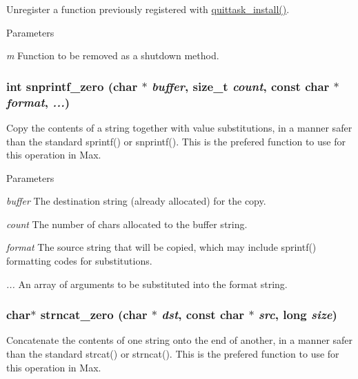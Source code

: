 Unregister a function previously registered with \hyperlink{group__misc_ga0638f6ac63b75fa53c0a34db8ec8d412}{quittask\_\-install()}. 
\begin{DoxyParams}{Parameters}
\item[{\em m}]Function to be removed as a shutdown method. \end{DoxyParams}
\hypertarget{group__misc_gab82e9c5bbc8b7fe70d16b1f6383f1cc4}{
\subsubsection[{snprintf\_\-zero}]{\setlength{\rightskip}{0pt plus 5cm}int snprintf\_\-zero (char $\ast$ {\em buffer}, \/  size\_\-t {\em count}, \/  const char $\ast$ {\em format}, \/   {\em ...})}}
\label{group__misc_gab82e9c5bbc8b7fe70d16b1f6383f1cc4}


Copy the contents of a string together with value substitutions, in a manner safer than the standard sprintf() or snprintf(). This is the prefered function to use for this operation in Max.


\begin{DoxyParams}{Parameters}
\item[{\em buffer}]The destination string (already allocated) for the copy. \item[{\em count}]The number of chars allocated to the buffer string. \item[{\em format}]The source string that will be copied, which may include sprintf() formatting codes for substitutions. \item[{\em ...}]An array of arguments to be substituted into the format string. \end{DoxyParams}
\hypertarget{group__misc_ga3ed4f46782e6a41d13ca17420c35dfb7}{
\subsubsection[{strncat\_\-zero}]{\setlength{\rightskip}{0pt plus 5cm}char$\ast$ strncat\_\-zero (char $\ast$ {\em dst}, \/  const char $\ast$ {\em src}, \/  long {\em size})}}
\label{group__misc_ga3ed4f46782e6a41d13ca17420c35dfb7}


Concatenate the contents of one string onto the end of another, in a manner safer than the standard strcat() or strncat(). This is the prefered function to use for this operation in Max.


